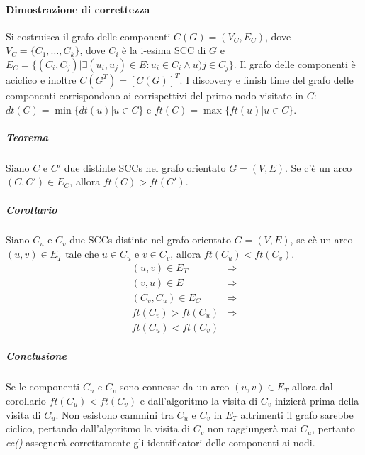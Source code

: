 \paragraph{Dimostrazione di correttezza}
Si costruisca il grafo delle componenti $C(G)=(V_C, E_C)$, dove $V_C=\{C_1, \dots, C_k\}$, dove $C_i$ \`e la i-esima SCC di $G$ e $E_C=\{(C_i, C_j)|\exists 
(u_i, u_j)\in E: u_i\in C_i\land u)j\in C_j\}$. Il grafo delle componenti \`e aciclico e inoltre $C(G^T)=[C(G)]^T$. I discovery e finish time del grafo 
delle componenti corrispondono ai corrispettivi del primo nodo visitato in $C$: $dt(C)=\min\{dt(u)|u\in C\}$ e $ft(C)=\max\{ft(u)|u\in C\}$.
\subparagraph{Teorema}
Siano $C$ e $C'$ due distinte SCCs nel grafo orientato $G=(V, E)$. Se c'\`e un arco $(C, C')\in E_C$, allora $ft(C)>ft(C')$.
\subparagraph{Corollario}
Siano $C_u$ e $C_v$ due SCCs distinte nel grafo orientato $G=(V, E)$, se c\`e un arco $(u, v)\in E_T$ tale che $u\in C_u$ e $v\in C_v$, allora $ft(C_u)<
ft(C_v)$. 
\begin{align*}
(u, v)\in E_T & \Rightarrow\\
(v, u)\in E & \Rightarrow\\
(C_v, C_u)\in E_C & \Rightarrow\\
ft(C_v)>ft(C_u) & \Rightarrow\\
ft(C_u)<ft(C_v) &
\end{align*}
\subparagraph{Conclusione}
Se le componenti $C_u$ e $C_v$ sono connesse da un arco $(u, v)\in E_T$ allora dal corollario $ft(C_u)<ft(C_v)$ e dall'algoritmo la visita di $C_v$ 
inizier\`a prima della visita di $C_u$. Non esistono cammini tra $C_u$ e $C_v$ in $E_T$ altrimenti il grafo sarebbe ciclico, pertando dall'algoritmo la
visita di $C_v$ non raggiunger\`a mai $C_u$, pertanto \emph{cc()} assegner\`a correttamente gli identificatori delle componenti ai nodi.
